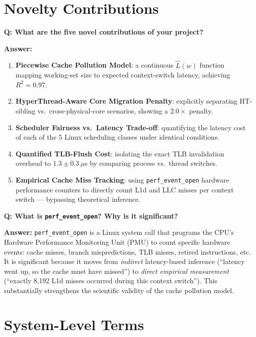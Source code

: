 \documentclass[12pt,a4paper]{article}
\newcommand{\Q}[1]{\begin{mdframed}[style=qbox]
\textbf{\textcolor{qcol}{Q: #1}}\end{mdframed}\vspace{2pt}}
\newcommand{\A}[1]{\begin{mdframed}[style=abox]
\textbf{\textcolor{acol}{Answer:}} #1\end{mdframed}\vspace{10pt}}
\begin{document}
\section{Novelty Contributions}

\Q{What are the five novel contributions of your project?}
\A{\begin{enumerate}[nosep]
  \item \textbf{Piecewise Cache Pollution Model}: a continuous $\hat{L}(w)$ function mapping working-set size to expected context-switch latency, achieving $R^2=0.97$.
  \item \textbf{HyperThread-Aware Core Migration Penalty}: explicitly separating HT-sibling vs.\ cross-physical-core scenarios, showing a $2.0\times$ penalty.
  \item \textbf{Scheduler Fairness vs.\ Latency Trade-off}: quantifying the latency cost of each of the 5 Linux scheduling classes under identical conditions.
  \item \textbf{Quantified TLB-Flush Cost}: isolating the exact TLB invalidation overhead to $1.3 \pm 0.3~\mu$s by comparing process vs.\ thread switches.
  \item \textbf{Empirical Cache Miss Tracking}: using \texttt{perf\_event\_open} hardware performance counters to directly count L1d and LLC misses per context switch --- bypassing theoretical inference.
\end{enumerate}}

\Q{What is \texttt{perf\_event\_open}? Why is it significant?}
\A{\texttt{perf\_event\_open} is a Linux system call that programs the CPU's Hardware Performance Monitoring Unit (PMU) to count specific hardware events: cache misses, branch mispredictions, TLB misses, retired instructions, etc. It is significant because it moves from \textit{indirect} latency-based inference (``latency went up, so the cache must have missed'') to \textit{direct empirical measurement} (``exactly 8,192 L1d misses occurred during this context switch''). This substantially strengthens the scientific validity of the cache pollution model.}

\section{System-Level Terms}
\end{document}
